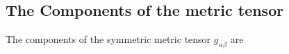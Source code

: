 \documentclass[lineno, pdflatex,sn-mathphys-ay]{sn-jnl}
\theoremstyle{thmstyleone}%
\theoremstyle{thmstyletwo}%
\theoremstyle{thmstylethree}%
\begin{document}
\begin{appendices}
\subsection{The Components of the metric tensor}\label{appendix:metric_tensor_off_diagonal}

The components of the symmetric metric tensor $g_{\alpha\beta}$ are



\end{appendices}
\end{document}
